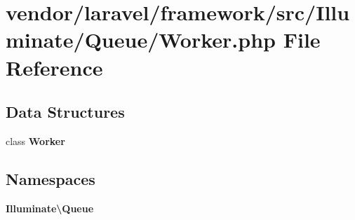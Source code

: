 \section{vendor/laravel/framework/src/\+Illuminate/\+Queue/\+Worker.php File Reference}
\label{_worker_8php}
\subsection*{Data Structures}
\begin{DoxyCompactItemize}
\item 
class {\bf Worker}
\end{DoxyCompactItemize}
\subsection*{Namespaces}
\begin{DoxyCompactItemize}
\item 
 {\bf Illuminate\textbackslash{}\+Queue}
\end{DoxyCompactItemize}

